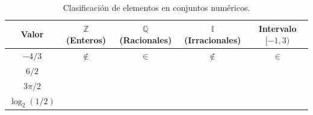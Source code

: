 \begin{enumerate}
    \begin{table}[ht]
    \centering
    \renewcommand{\arraystretch}{1.5}
    \begin{tabular}{|c|c|c|c|c|}
    \hline
    \textbf{Valor} & $\mathbb{Z}$ (Enteros) & $\mathbb{Q}$ (Racionales) & $\mathbb{I}$ (Irracionales) & Intervalo $[-1, 3)$ \\ \hline
    $ -4/3 $        & $\notin$ & $\in$ & $\notin$ & $\in$ \\ \hline
    $ 6/2$          &          &       &          &       \\ \hline
    $ 3\pi/2 $      &          &       &          &       \\ \hline
    $\log_{2}(1/2)$ &          &       &          &       \\ \hline
    \end{tabular}
    \caption{Clasificación de elementos en conjuntos numéricos.}
    \end{table}

\end{enumerate}
